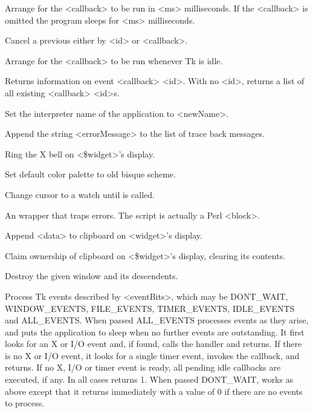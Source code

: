 \begin{enum}{1cm}

Arrange for the <callback> to be run in <ms> milliseconds.  If the <callback> is
omitted the program sleeps for <ms> milliseconds.

Cancel a previous  either by <id> or <callback>.

Arrange for the <callback> to be run whenever Tk is idle.

Returns information on event <callback> <id>.  With no <id>, returns a list
of all existing <callback> <id>s.

Set the interpreter name of the application to <newName>.

Append the string <errorMessage> to the list of trace back messages.

Ring the X bell on <\$widget>'s display.

Set default color palette to old bisque scheme.

Change cursor to a watch until  is called.

An  wrapper that traps errors.  The script is actually
a Perl <block>.

Append <data> to clipboard on <widget>'s display.

Claim ownership of clipboard on <\$widget>'s display, clearing its contents.

Destroy the given window and its descendents.

Process Tk events described by <eventBits>, which may be
DONT\_WAIT, WINDOW\_EVENTS, FILE\_EVENTS, TIMER\_EVENTS, 
IDLE\_EVENTS and ALL\_EVENTS.
When passed ALL\_EVENTS  processes events as they
arise, and puts the application to sleep when no further events are
outstanding.  It first looks for an X or I/O event and, if found,
calls the handler and returns.  If there is no X or I/O event, it looks for a
single timer event, invokes the callback, and returns.  If no X, I/O or timer
event is ready, all pending idle callbacks are executed, if any.  In all cases
 returns 1.
When passed DONT\_WAIT,  works as above except that
it returns immediately with a value of 0 if there
are no events to process.


\end{enum}
